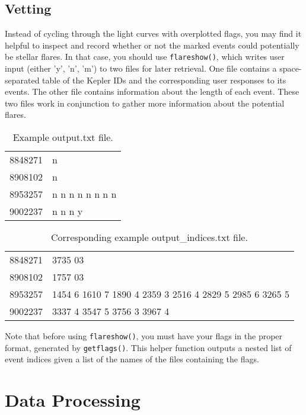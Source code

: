 \documentclass[11pt]{article}
\begin{document}
\subsection{Vetting}
\label{sec:vet}

Instead of cycling through the light curves with overplotted flags,
you may find it helpful to inspect and record whether or not the
marked events could potentially be stellar flares.  In that case, you
should use \verb|flareshow()|, which writes user input (either 'y',
'n', 'm') to two files for later retrieval.  One file contains a
space-separated table of the Kepler IDs and the corresponding user
responses to its events.  The other file contains information about
the length of each event.  These two files work in conjunction to
gather more information about the potential flares.

\begin{table}[h]
  \centering
  \begin{tabular}{l l}

8848271 &  n \\
8908102 &  n \\
8953257 &  n  n  n  n  n  n  n  n \\
9002237 &  n  n  n  y \\
\end{tabular}
\caption{Example output.txt file.}
\end{table}

\begin{table}[h]
  \centering
  \begin{tabular}{l l}

8848271 &  3735 03 \\
8908102 &  1757 03 \\
8953257 &  1454  6 1610  7 1890  4 2359  3 2516  4 2829  5 2985  6
3265  5 \\
9002237 &  3337  4 3547  5 3756  3 3967  4 \\
\end{tabular}
\caption{Corresponding example output\_indices.txt file.}
\end{table}

Note that before using \verb|flareshow()|, you must have your flags in
the proper format, generated by \verb|getflags()|.  This helper
function outputs a nested list of event indices given a list of the
names of the files containing the flags.

\section{Data Processing}
\label{sec:advanced}
\end{document}
